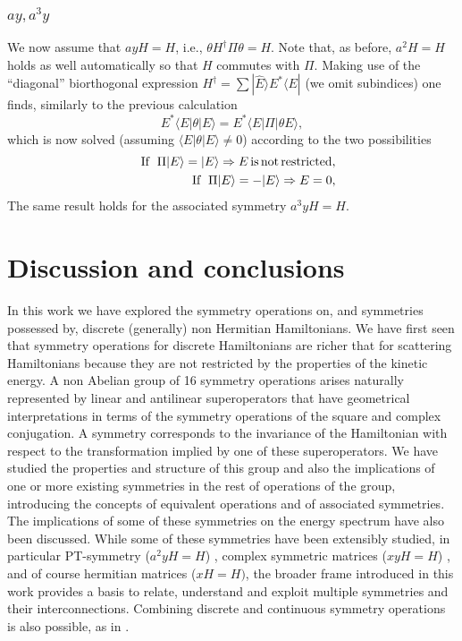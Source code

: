 {\subsubsection{$ay, a^3y$}
%
We now assume that $ayH=H$, i.e., $\theta H^\dagger\Pi\theta=H$. Note that, as before, $a^2 H=H$
holds as well automatically so that $H$ commutes with $\Pi$.
Making use of the ``diagonal'' biorthogonal  expression $H^\dagger=\sum |\widehat{E}\rangle  E^* \langle E|$
(we omit subindices) one finds, similarly to the previous calculation
%
\begin{equation}
E^*\langle E| \theta |E\rangle=E^*\langle E|\Pi|\theta E\rangle,
\end{equation}
%
which is now solved (assuming $\langle E| \theta |E\rangle\ne 0$)  according to the two possibilities
%
\begin{eqnarray}
&&{\rm If}\;\; \Pi|E\rangle=|E\rangle\Rightarrow   E\, {\rm is\, not\, restricted},
\\
&&{\rm If}\;\; \Pi|E\rangle=-|E\rangle \Rightarrow E=0,
\end{eqnarray}
%
The same result holds for the associated symmetry $a^3yH=H$.
%






\section{Discussion and conclusions\label{cd}}
%
In this work we have explored the symmetry operations on, and symmetries possessed
by, discrete (generally) non Hermitian Hamiltonians.
We have first seen that symmetry operations for discrete Hamiltonians are richer
that for scattering Hamiltonians because they are not restricted by the properties of the kinetic energy.
A non Abelian group of 16 symmetry operations arises naturally represented by linear and antilinear superoperators
that have geometrical interpretations
in terms of the symmetry operations of the square and complex conjugation.
A symmetry corresponds to the invariance of the Hamiltonian with respect to the transformation implied by one of these superoperators.
We have studied the properties and structure of this group and also
the implications of one or more existing symmetries in the rest of operations of the group,
introducing the  concepts of equivalent operations and of associated symmetries. The implications of some of these symmetries on the energy spectrum have also been discussed.
While some of these symmetries have been extensibly studied,  in particular PT-symmetry ($a^2yH=H$) \cite{Znojil2015}, complex symmetric matrices ($xyH=H$) \cite{Garcia2014},
and of course hermitian matrices ($xH=H)$, the broader frame introduced in this work provides a basis to relate,
understand and exploit multiple symmetries and their interconnections.
Combining discrete and continuous symmetry operations is also possible, as in \cite{Kartashov2014,Zezyulin2017}.






}

